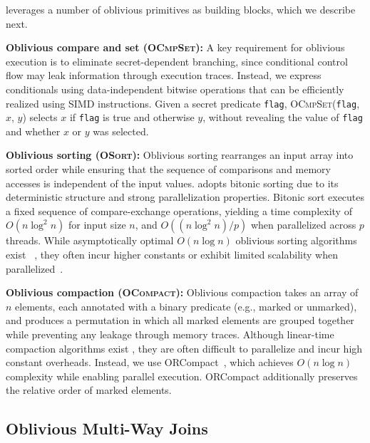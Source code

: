 \system leverages a number of oblivious primitives as building blocks, which we describe next.

\noindent\textbf{Oblivious compare and set (\textsc{OCmpSet}):}  
A key requirement for oblivious execution is to eliminate secret-dependent branching,
since conditional control flow may leak information through execution traces.  
Instead, we express conditionals using data-independent bitwise operations that can be
efficiently realized using SIMD instructions.  
Given a secret predicate \texttt{flag}, \textsc{OCmpSet}(\texttt{flag}, $x$, $y$) selects $x$ if \texttt{flag}
is true and otherwise $y$, without revealing the value of \texttt{flag} and whether $x$ or $y$ was selected.

\noindent\textbf{Oblivious sorting (\textsc{OSort}):}  
Oblivious sorting rearranges an input array into sorted order while ensuring that the
sequence of comparisons and memory accesses is independent of the input values.
\system adopts bitonic sorting \cite{batcher1968sorting} due to its deterministic structure and 
strong parallelization properties. Bitonic sort executes a fixed sequence of compare-exchange
operations, yielding a time complexity of $O(n \log^2 n)$ for input size $n$, and
$O((n \log^2 n)/p)$ when parallelized across $p$ threads.  
While asymptotically optimal $O(n \log n)$ oblivious sorting algorithms exist ~\cite{ajtai1983sorting, 
goodrich2014zigzag, gu2025flexway}, they often incur higher constants or exhibit limited scalability when
parallelized~\cite{ngai2024distributed}.  

\noindent\textbf{Oblivious compaction (\textsc{OCompact}):}  
Oblivious compaction takes an array of $n$ elements, each annotated with a binary
predicate (e.g., marked or unmarked), and produces a permutation in which all marked
elements are grouped together while preventing any leakage through memory traces.  
Although linear-time compaction algorithms exist \cite{dittmer2020oblivious,goodrich2011oblivious},
they are often difficult to parallelize and incur high constant overheads. Instead, we use 
ORCompact~\cite{sasy2022fast}, which achieves $O(n \log n)$ complexity while enabling parallel execution.  
ORCompact additionally preserves the relative order of marked elements.



\subsection{Oblivious Multi-Way Joins}
\label{sec:background:joins}

